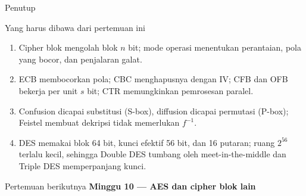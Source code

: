 \documentclass[aspectratio=169,11pt]{beamer}
\begin{document}
\begin{frame}{Penutup}
    \begin{block}{Yang harus dibawa dari pertemuan ini}
        \begin{enumerate}
            \item Cipher blok mengolah blok $n$ bit; mode operasi
                  menentukan perantaian, pola yang bocor, dan penjalaran
                  galat.
            \item ECB membocorkan pola; CBC menghapusnya dengan IV;
                  CFB dan OFB bekerja per unit $s$ bit; CTR memungkinkan
                  pemrosesan paralel.
            \item Confusion dicapai substitusi (S-box), diffusion dicapai
                  permutasi (P-box); Feistel membuat dekripsi tidak
                  memerlukan $f^{-1}$.
            \item DES memakai blok 64 bit, kunci efektif 56 bit, dan 16
                  putaran; ruang $2^{56}$ terlalu kecil, sehingga Double
                  DES tumbang oleh meet-in-the-middle dan Triple DES
                  memperpanjang kunci.
        \end{enumerate}
    \end{block}
    \vspace{0.2cm}
    \begin{exampleblock}{Pertemuan berikutnya}
        \textbf{Minggu 10 --- AES dan cipher blok lain}
    \end{exampleblock}
\end{frame}
\end{document}
